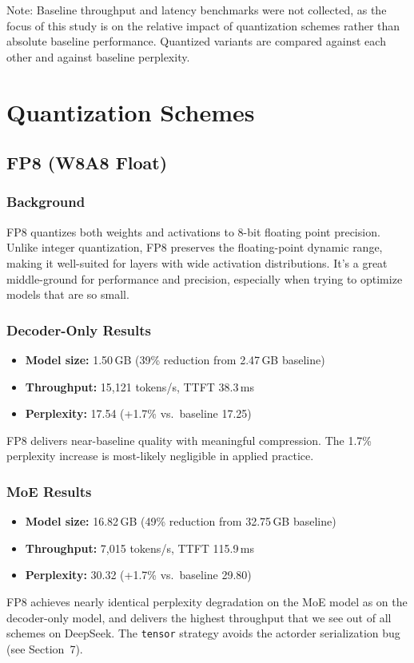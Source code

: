 \documentclass[10pt,twocolumn]{article}
\begin{document}
Note: Baseline throughput and latency benchmarks were not collected, as the focus of this study is on the relative impact of quantization schemes rather than absolute baseline performance. Quantized variants are compared against each other and against baseline perplexity.

\section{Quantization Schemes}

\subsection{FP8 (W8A8 Float)}
\subsubsection{Background}
FP8 quantizes both weights and activations to 8-bit floating point precision. Unlike integer quantization, FP8 preserves the floating-point dynamic range, making it well-suited for layers with wide activation distributions. It's a great middle-ground for performance and precision, especially when trying to optimize models that are so small.

\subsubsection{Decoder-Only Results}
\begin{itemize}
  \item \textbf{Model size:} 1.50\,GB (39\% reduction from 2.47\,GB baseline)
  \item \textbf{Throughput:} 15{,}121 tokens/s, TTFT 38.3\,ms
  \item \textbf{Perplexity:} 17.54 (+1.7\% vs.\ baseline 17.25)
\end{itemize}
FP8 delivers near-baseline quality with meaningful compression. The 1.7\% perplexity increase is most-likely negligible in applied practice.

\subsubsection{MoE Results}
\begin{itemize}
  \item \textbf{Model size:} 16.82\,GB (49\% reduction from 32.75\,GB baseline)
  \item \textbf{Throughput:} 7{,}015 tokens/s, TTFT 115.9\,ms
  \item \textbf{Perplexity:} 30.32 (+1.7\% vs.\ baseline 29.80)
\end{itemize}
FP8 achieves nearly identical perplexity degradation on the MoE model as on the decoder-only model, and delivers the highest throughput that we see out of all schemes on DeepSeek. The \texttt{tensor} strategy avoids the actorder serialization bug (see Section~7).
\end{document}
